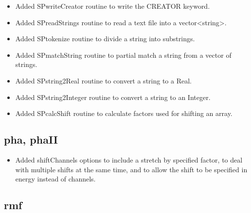 \documentclass[11pt]{book}
\begin{document}
\begin{itemize}

\item Added SPwriteCreator routine to write the CREATOR keyword.

\item Added SPreadStrings routine to read a text file into a
  vector<string>.

\item Added SPtokenize routine to divide a string into substrings.

\item Added SPmatchString routine to partial match a string from a
  vector of strings.

\item Added SPstring2Real routine to convert a string to a Real.

\item Added SPstring2Integer routine to convert a string to an Integer.

\item Added SPcalcShift routine to calculate factors used for shifting
  an array.

\end{itemize}

\subsection{pha, phaII}

\begin{itemize}

\item Added shiftChannels options to include a stretch by specified
  factor, to deal with multiple shifts at the same time, and to allow
  the shift to be specified in energy instead of channels.

\end{itemize}

\subsection{rmf}
\end{document}
